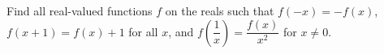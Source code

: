 Find all real-valued functions $f$ on the reals such that $f(-x) = -f(x)$, $f(x+1) = f(x) + 1$ for all $x$, and $f\left(\dfrac{1}{x}\right) = \dfrac{f(x)}{x^2}$ for $x \not = 0$.
